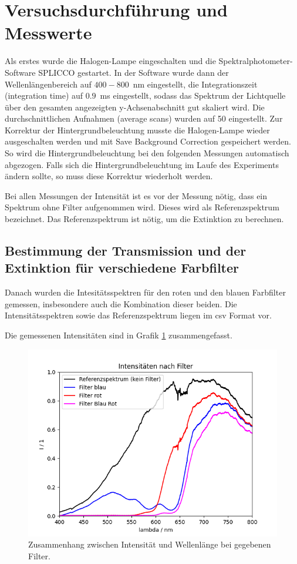 \documentclass{article}
\begin{document}
\section{Versuchsdurchführung und Messwerte}

Als erstes wurde die Halogen-Lampe eingeschalten und die Spektralphotometer-Software SPLICCO gestartet. In der Software wurde dann der Wellenlängenbereich auf $400-800$~nm eingestellt, die Integrationszeit (integration time) auf $0.9$~ms eingestellt, sodass das Spektrum der Lichtquelle über den gesamten angezeigten y-Achsenabschnitt gut skaliert wird. Die durchschnittlichen Aufnahmen (average scans) wurden auf 50 eingestellt.
Zur Korrektur der Hintergrundbeleuchtung musste die Halogen-Lampe wieder ausgeschalten werden und mit Save Background Correction gespeichert werden. So wird die Hintergrundbeleuchtung bei den folgenden Messungen automatisch abgezogen. Falls sich die Hintergrundbeleuchtung im Laufe des Experiments ändern sollte, so muss diese Korrektur wiederholt werden.

Bei allen Messungen der Intensität ist es vor der Messung nötig, dass ein Spektrum ohne Filter aufgenommen wird. Dieses wird als Referenzspektrum bezeichnet. Das Referenzspektrum ist nötig, um die Extinktion zu berechnen.

\subsection{Bestimmung der Transmission und der Extinktion für verschiedene Farbfilter}

Danach wurden die Intesitätsspektren für den roten und den blauen Farbfilter gemessen, insbesondere auch die Kombination dieser beiden. Die Intensitätsspektren sowie das Referenzspektrum liegen im csv Format vor.



Die gemessenen Intensitäten sind in Grafik \ref{fig:I_Methyl} zusammengefasst.

\begin{figure}[H]
\centering
\caption{Zusammenhang zwischen Intensität und Wellenlänge bei gegebenen Filter.}
\label{fig:I_Methyl}
\includegraphics[scale=0.7]{FF_Intensitaeten.png}
\end{figure}
\end{document}
